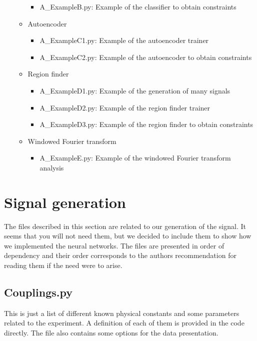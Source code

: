 \documentclass{article}
\begin{document}
\begin{itemize}
\begin{itemize}
    \begin{itemize}
      \item A\_ExampleB.py: Example of the classifier to obtain constraints
    \end{itemize}
    \item Autoencoder
    \begin{itemize}
      \item A\_ExampleC1.py: Example of the autoencoder trainer
      \item A\_ExampleC2.py: Example of the autoencoder to obtain constraints
    \end{itemize}
    \item Region finder
    \begin{itemize}
      \item A\_ExampleD1.py: Example of the generation of many signals
      \item A\_ExampleD2.py: Example of the region finder trainer
      \item A\_ExampleD3.py: Example of the region finder to obtain constraints
    \end{itemize}
    \item Windowed Fourier transform
    \begin{itemize}
      \item A\_ExampleE.py: Example of the windowed Fourier transform analysis
    \end{itemize}
  \end{itemize}
\end{itemize}

\pagebreak

\section{Signal generation}
The files described in this section are related to our generation of the signal. It seems that you will not need them, but we decided to include them to show how we implemented the neural networks. The files are presented in order of dependency and their order corresponds to the authors recommendation for reading them if the need were to arise.

\subsection{Couplings.py}
This is just a list of different known physical constants and some parameters related to the experiment. A definition of each of them is provided in the code directly. The file also contains some options for the data presentation.
\end{document}
